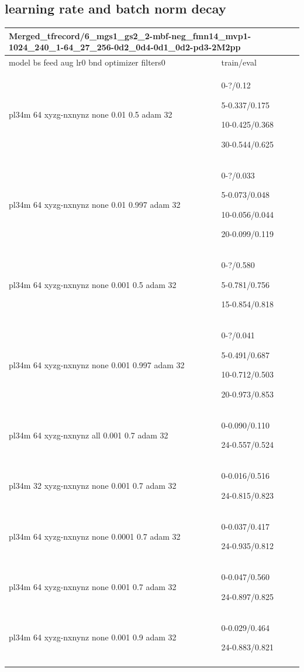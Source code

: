 \documentclass[,table,dvipsnames]{article}
\begin{document}
\subsection{learning rate and batch norm decay}
\noindent\begin{tabular}{|p{10cm}|p{5cm}| }	
	\hline
	\multicolumn{2}{|p{15cm}|}{Merged\_tfrecord/6\_mgs1\_gs2\_2-mbf-neg\_fmn14\_mvp1-1024\_240\_1-64\_27\_256-0d2\_0d4-0d1\_0d2-pd3-2M2pp}\\
	\hline
	model bs feed aug lr0 bnd optimizer filters0 & train/eval \\
	\hline
	pl34m 64 xyzg-nxnynz none 0.01 0.5 adam 32 &0-?/0.12\par 5-0.337/0.175\par 10-0.425/0.368\par 30-0.544/0.625 \\
	\hline
	pl34m 64 xyzg-nxnynz none 0.01 0.997 adam 32 &0-?/0.033\par 5-0.073/0.048\par 10-0.056/0.044\par 20-0.099/0.119\\
	\rowcolor{green!10}
	pl34m 64 xyzg-nxnynz none 0.001 0.5 adam 32 & 0-?/0.580\par 5-0.781/0.756\par 
	15-0.854/0.818\\
	\rowcolor{yellow!10}
	pl34m 64 xyzg-nxnynz none 0.001 0.997 adam 32 & 0-?/0.041\par 5-0.491/0.687\par 10-0.712/0.503\par 20-0.973/0.853\\
	\hline
	pl34m 64 xyzg-nxnynz all 0.001 0.7 adam 32 & 0-0.090/0.110\par 24-0.557/0.524\\
	\hline
	pl34m 32 xyzg-nxnynz none 0.001 0.7 adam 32 & 0-0.016/0.516\par 24-0.815/0.823 \\
	\hline	
	pl34m 64 xyzg-nxnynz none 0.0001 0.7 adam 32 & 0-0.037/0.417\par 24-0.935/0.812\\
	\hline
	pl34m 64 xyzg-nxnynz none 0.001 0.7 adam 32 &0-0.047/0.560\par 24-0.897/0.825 \\
	\hline
	pl34m 64 xyzg-nxnynz none 0.001 0.9 adam 32 &0-0.029/0.464\par 24-0.883/0.821\\
	\hline \hline \\ \hline
	

\end{tabular}
\end{document}
